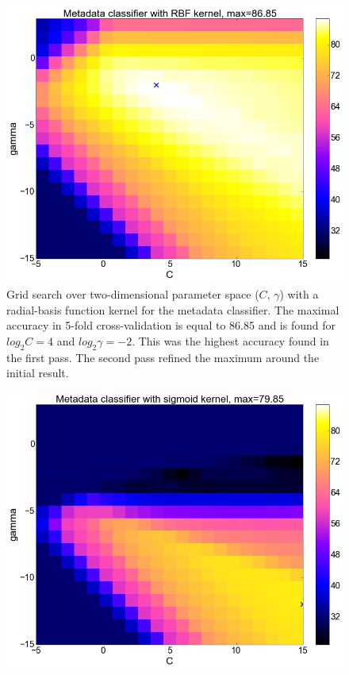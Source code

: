 \begin{center}
\begin{figure}
	\centering
  \includegraphics[width=\textwidth]{plots/meta_rbf}
   \caption{Grid search over two-dimensional parameter space ($C$, $\gamma$) with a radial-basis function kernel for the metadata classifier. The maximal accuracy in 5-fold cross-validation is equal to 86.85 and is found for $log_{2}C=4$ and $log_{2}\gamma=-2$. This was the highest accuracy found in the first pass. The second pass refined the maximum around the initial result.}
  \label{fig:meta_rbf}
\end{figure}
\begin{figure}
	\centering
  \includegraphics[width=\textwidth]{plots/meta_sigmoid}

\end{figure}
\end{center}
